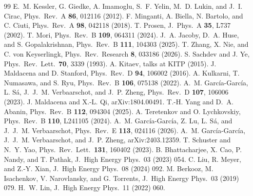 \documentclass[aps,pre,twocolumn,superscriptaddress,amsmath,amssymb,10pt]{revtex4-2}
\begin{document}
\begin{thebibliography}{99}
 E.~M. Kessler, G. Giedke, A. Imamoglu, S.~F. Yelin, M.~D. Lukin, and J.~I. Cirac, Phys.\ Rev.\ A \textbf{86}, 012116 (2012).
 F. Minganti, A. Biella, N. Bartolo, and C. Ciuti, Phys.\ Rev.\ A \textbf{98}, 042118 (2018).
 T. Prosen, J.\ Phys.\ A \textbf{35}, L737 (2002).
 T. Mori, Phys.\ Rev.\ B \textbf{109}, 064311 (2024).
 J.~A. Jacoby, D.~A. Huse, and S. Gopalakrishnan, Phys.\ Rev.\ B \textbf{111}, 104303 (2025).
 T. Zhang, X. Nie, and C. von Keyserlingk, Phys.\ Rev.\ Research \textbf{8}, 033186 (2026).
 S. Sachdev and J. Ye, Phys.\ Rev.\ Lett.\ \textbf{70}, 3339 (1993).
 A. Kitaev, talks at KITP (2015).
 J. Maldacena and D. Stanford, Phys.\ Rev.\ D \textbf{94}, 106002 (2016).
 A. Kulkarni, T. Numasawa, and S. Ryu, Phys.\ Rev.\ B \textbf{106}, 075138 (2022).
 A.~M. Garc\'ia-Garc\'ia, L. S\'a, J.~J.~M. Verbaarschot, and J.~P. Zheng, Phys.\ Rev.\ D \textbf{107}, 106006 (2023).
 J. Maldacena and X.-L. Qi, arXiv:1804.00491.
 T.-H. Yang and D.~A. Abanin, Phys.\ Rev.\ B \textbf{112}, 094304 (2025).
 A. Teretenkov and O. Lychkovskiy, Phys.\ Rev.\ B \textbf{110}, L241105 (2024).
 A.~M. Garc\'ia-Garc\'ia, Z. Lu, L. S\'a, and J.~J.~M. Verbaarschot, Phys.\ Rev.\ E \textbf{113}, 024116 (2026).
 A.~M. Garc\'ia-Garc\'ia, J.~J.~M. Verbaarschot, and J.~P. Zheng, arXiv:2403.12359.
 T. Schuster and N.~Y. Yao, Phys.\ Rev.\ Lett.\ \textbf{131}, 160402 (2023).
 B. Bhattacharjee, X. Cao, P. Nandy, and T. Pathak, J.\ High Energy Phys.\ 03 (2023) 054.
 C. Liu, R. Meyer, and Z.-Y. Xian, J.\ High Energy Phys.\ 08 (2024) 092.
 M. Berkooz, M. Isachenkov, V. Narovlansky, and G. Torrents, J.\ High Energy Phys.\ 03 (2019) 079.
 H.~W. Lin, J.\ High Energy Phys.\ 11 (2022) 060.
\end{thebibliography}
\end{document}

